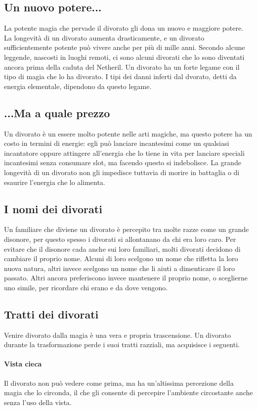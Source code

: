 \subsection{Un nuovo potere...}
La potente magia che pervade il divorato gli dona un nuovo e maggiore potere. La longevità di un divorato aumenta drasticamente, e un divorato sufficientemente potente può vivere anche per più di mille anni. Secondo alcune leggende, nascosti in luoghi remoti, ci sono alcuni divorati che lo sono diventati ancora prima della caduta del Netheril.  Un divorato ha un forte legame con il tipo di magia che lo ha divorato. I tipi dei danni inferti dal dvorato, detti da energia elementale, dipendono da questo legame.

\subsection{...Ma a quale prezzo}
Un divorato è un essere molto potente nelle arti magiche, ma questo potere ha un costo in termini di energie: egli può lanciare incantesimi come un qualsiasi incantatore oppure attingere all'energia che lo tiene in vita per lanciare speciali incantesimi senza consumare slot, ma facendo questo si indebolisce. La grande longevità di un divorato non gli impedisce tuttavia di morire in battaglia o di esaurire l'energia che lo alimenta. 

\subsection{I nomi dei divorati}
Un familiare che diviene un divorato è percepito tra molte razze come un grande
disonore, per questo spesso i divorati si allontanano da chi era loro caro. Per evitare che il disonore cada anche sui loro familiari, molti divorati decidono di cambiare il proprio nome. Alcuni di loro scelgono un nome che rifletta la loro nuova natura, altri invece scelgono un nome che li aiuti a dimenticare il loro passato. Altri ancora preferiscono invece mantenere il proprio nome, o sceglierne uno simile, per ricordare chi erano e da dove vengono.

\subsection{Tratti dei divorati}
Venire divorato dalla magia è una vera e propria trascensione. Un divorato durante la trasformazione perde i suoi tratti razziali, ma acquisisce i seguenti.
\paragraph{Vista cieca} Il divorato non può vedere come prima, ma ha un'altissima percezione della magia che lo circonda, il che gli consente di percepire l'ambiente circostante anche senza l'uso della vista.
